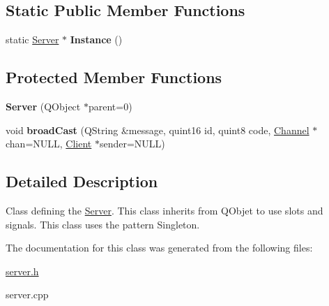 \subsection*{Static Public Member Functions}
\begin{DoxyCompactItemize}
\item 
\hypertarget{class_server_a319f8da4a27ca0b79f37c3d741336464}{static \hyperlink{class_server}{Server} $\ast$ {\bfseries Instance} ()}\label{class_server_a319f8da4a27ca0b79f37c3d741336464}

\end{DoxyCompactItemize}
\subsection*{Protected Member Functions}
\begin{DoxyCompactItemize}
\item 
\hypertarget{class_server_a1950ac036d86af898428d7ba39bbf048}{{\bfseries Server} (Q\-Object $\ast$parent=0)}\label{class_server_a1950ac036d86af898428d7ba39bbf048}

\item 
\hypertarget{class_server_a1eb8da7c7b488255612584a4442d09fe}{void {\bfseries broad\-Cast} (Q\-String \&message, quint16 id, quint8 code, \hyperlink{class_channel}{Channel} $\ast$chan=N\-U\-L\-L, \hyperlink{class_client}{Client} $\ast$sender=N\-U\-L\-L)}\label{class_server_a1eb8da7c7b488255612584a4442d09fe}

\end{DoxyCompactItemize}


\subsection{Detailed Description}
Class defining the \hyperlink{class_server}{Server}. This class inherits from Q\-Objet to use slots and signals. This class uses the pattern Singleton. 

The documentation for this class was generated from the following files\-:\begin{DoxyCompactItemize}
\item 
\hyperlink{server_8h}{server.\-h}\item 
server.\-cpp\end{DoxyCompactItemize}
